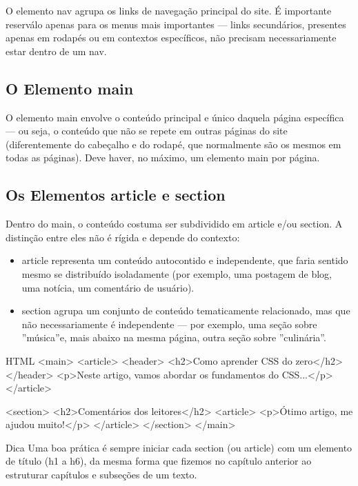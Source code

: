 O elemento nav agrupa os links de navegação principal do site. É importante reserválo apenas para os menus mais importantes — links secundários, presentes apenas em rodapés ou em contextos específicos, não precisam necessariamente estar dentro de um nav.

\subsection{O Elemento main}

O elemento main envolve o conteúdo principal e único daquela página específica — ou seja, o conteúdo que não se repete em outras páginas do site (diferentemente do cabeçalho e do rodapé, que normalmente são os mesmos em todas as páginas). Deve haver, no máximo, um elemento main por página.

\subsection{Os Elementos article e section}

Dentro do main, o conteúdo costuma ser subdividido em article e/ou section. A distinção entre eles não é rígida e depende do contexto:

\begin{itemize}
  \item article representa um conteúdo autocontido e independente, que faria sentido mesmo se distribuído isoladamente (por exemplo, uma postagem de blog, uma notícia, um comentário de usuário).
\end{itemize}

\begin{itemize}
  \item section agrupa um conjunto de conteúdo tematicamente relacionado, mas que não necessariamente é independente — por exemplo, uma seção sobre ”música”e, mais abaixo na mesma página, outra seção sobre ”culinária”.
\end{itemize}

\begin{codebox}{HTML}
<main>
  <article>
    <header>
       <h2>Como aprender CSS do zero</h2>
    </header>
    <p>Neste artigo, vamos abordar os fundamentos do CSS...</p>
  </article>

  <section>
    <h2>Comentários dos leitores</h2>
    <article>
      <p>Ótimo artigo, me ajudou muito!</p>
    </article>
  </section>
</main>
\end{codebox}

\begin{infobox}{Dica}
Uma boa prática é sempre iniciar cada section (ou article) com um elemento de título (h1 a h6), da mesma forma que fizemos no capítulo anterior ao estruturar capítulos e subseções de um texto.
\end{infobox}

